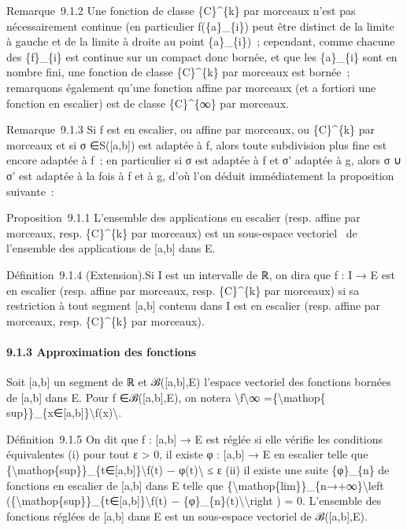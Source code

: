 \documentclass[]{article}
\begin{document}
Remarque~9.1.2 Une fonction de classe \{C\}\^{}\{k\} par morceaux n'est
pas nécessairement continue (en particulier f(\{a\}\_\{i\}) peut être
distinct de la limite à gauche et de la limite à droite au point
\{a\}\_\{i\})~; cependant, comme chacune des \{f\}\_\{i\} est continue
sur un compact donc bornée, et que les \{a\}\_\{i\} sont en nombre fini,
une fonction de classe \{C\}\^{}\{k\} par morceaux est bornée~;
remarquons également qu'une fonction affine par morceaux (et a fortiori
une fonction en escalier) est de classe \{C\}\^{}\{∞\} par morceaux.

Remarque~9.1.3 Si f est en escalier, ou affine par morceaux, ou
\{C\}\^{}\{k\} par morceaux et si σ ∈S({[}a,b{]}) est adaptée à f, alors
toute subdivision plus fine est encore adaptée à f~; en particulier si σ
est adaptée à f et σ' adaptée à g, alors σ ∪ σ' est adaptée à la fois à
f et à g, d'où l'on déduit immédiatement la proposition suivante~:

Proposition~9.1.1 L'ensemble des applications en escalier (resp. affine
par morceaux, resp. \{C\}\^{}\{k\} par morceaux) est un sous-espace
vectoriel ~de l'ensemble des applications de {[}a,b{]} dans E.

Définition~9.1.4 (Extension).Si I est un intervalle de ℝ, on dira que f
: I → E est en escalier (resp. affine par morceaux, resp. \{C\}\^{}\{k\}
par morceaux) si sa restriction à tout segment {[}a,b{]} contenu dans I
est en escalier (resp. affine par morceaux, resp. \{C\}\^{}\{k\} par
morceaux).

\paragraph{9.1.3 Approximation des fonctions}

Soit {[}a,b{]} un segment de ℝ et ℬ({[}a,b{]},E) l'espace vectoriel des
fonctions bornées de {[}a,b{]} dans E. Pour f ∈ℬ({[}a,b{]},E), on notera
\textbackslash{}\textbar{}f\textbackslash{}\textbar{}∞
=\{\textbackslash{}mathop\{
sup\}\}\_\{x∈{[}a,b{]}\}\textbackslash{}\textbar{}f(x)\textbackslash{}\textbar{}.

Définition~9.1.5 On dit que f : {[}a,b{]} → E est réglée si elle vérifie
les conditions équivalentes (i) pour tout ε \textgreater{} 0, il existe
φ : {[}a,b{]} → E en escalier telle que
\{\textbackslash{}mathop\{sup\}\}\_\{t∈{[}a,b{]}\}\textbackslash{}\textbar{}f(t)
− φ(t)\textbackslash{}\textbar{} ≤ ε (ii) il existe une suite
\{φ\}\_\{n\} de fonctions en escalier de {[}a,b{]} dans E telle que
\{\textbackslash{}mathop\{lim\}\}\_\{n→+∞\}\textbackslash{}left
(\{\textbackslash{}mathop\{sup\}\}\_\{t∈{[}a,b{]}\}\textbackslash{}\textbar{}f(t)
− \{φ\}\_\{n\}(t)\textbackslash{}\textbar{}\textbackslash{}right ) = 0.
L'ensemble des fonctions réglées de {[}a,b{]} dans E est un sous-espace
vectoriel de ℬ({[}a,b{]},E).
\end{document}
